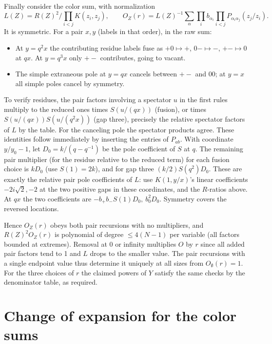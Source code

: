 \documentclass[11pt]{article}
\numberwithin{equation}{section}
\theoremstyle{definition}\newtheorem{definition}[theorem]{Definition}
\theoremstyle{remark}\newtheorem{remark}[theorem]{Remark}
\begin{document}
Finally consider the color sum, with normalization
\[
 L(Z)=R(Z)^2/\prod_{i<j}K(z_i,z_j),\qquad O_Z(r)=L(Z)^{-1}\sum_\alpha\prod_i b_{\alpha_i}\prod_{i<j}P_{\alpha_i\alpha_j}(z_j/z_i).
\]
It is symmetric. For a pair \(x,y\) (labels in that order), in the raw sum:
\begin{itemize}
\item At \(y=q^2x\) the contributing residue labels fuse as \(+0\mapsto+\), \(0-\mapsto-\), \(+-\mapsto0\) at \(qx\). At \(y=q^3x\) only \(+-\) contributes, going to vacant.
\item The simple extraneous pole at \(y=qx\) cancels between \(+-\) and \(00\); at \(y=x\) all simple poles cancel by symmetry.
\end{itemize}

To verify residues, the pair factors involving a spectator \(u\) in the first rules multiply to the reduced ones times \(S(u/(qx))\) (fusion), or times \(S(u/(qx))S(u/(q^2x))\) (gap three), precisely the relative spectator factors of \(L\) by the table. For the canceling pole the spectator products agree. These identities follow immediately by inserting the entries of \(P_{ab}\). With coordinate \(y/y_0-1\), let \(D_0=k/(q-q^{-1})\) be the pole coefficient of \(S\) at \(q\). The remaining pair multiplier (for the residue relative to the reduced term) for each fusion choice is \(k D_0\) (use \(S(1)=2k\)), and for gap three \((k/2)S(q^2)D_0\). These are exactly the relative pair pole coefficients of \(L\): use \(K(1,y/x)\)'s linear coefficients \(-2i\sqrt2,-2\) at the two positive gaps in these coordinates, and the \(R\)-ratios above. At \(qx\) the two coefficients are \(-b_+b_- S(1)D_0,\ b_0^2D_0\). Symmetry covers the reversed locations.

Hence \(O_Z(r)\) obeys both pair recursions with no multipliers, and \(R(Z)^2 O_Z(r)\) is polynomial of degree \(\le4(N-1)\) per variable (all factors bounded at extremes). Removal at 0 or infinity multiplies \(O\) by \(r\) since all added pair factors tend to 1 and \(L\) drops to the smaller value. The pair recursions with a single endpoint value thus determine it uniquely at all sizes from \(O_\emptyset(r)=1\). For the three choices of \(r\) the claimed powers of \(Y\) satisfy the same checks by the denominator table, as required.


\section{Change of expansion for the color sums}\label{L:part2}
\end{document}
